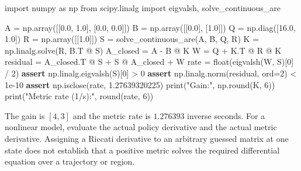 \documentclass[
  10pt,
  letterpaper,
  DIV=11,
  numbers=noendperiod]{scrartcl}
\newenvironment{Shaded}{\begin{snugshade}}{\end{snugshade}}
\newcommand{\BuiltInTok}[1]{\textcolor[rgb]{0.00,0.23,0.31}{#1}}
\newcommand{\ControlFlowTok}[1]{\textcolor[rgb]{0.00,0.23,0.31}{\textbf{#1}}}
\newcommand{\DecValTok}[1]{\textcolor[rgb]{0.68,0.00,0.00}{#1}}
\newcommand{\FloatTok}[1]{\textcolor[rgb]{0.68,0.00,0.00}{#1}}
\newcommand{\ImportTok}[1]{\textcolor[rgb]{0.00,0.46,0.62}{#1}}
\newcommand{\NormalTok}[1]{\textcolor[rgb]{0.00,0.23,0.31}{#1}}
\newcommand{\OperatorTok}[1]{\textcolor[rgb]{0.37,0.37,0.37}{#1}}
\newcommand{\StringTok}[1]{\textcolor[rgb]{0.13,0.47,0.30}{#1}}
\begin{document}
\begin{Shaded}
\begin{Highlighting}[]
\ImportTok{import}\NormalTok{ numpy }\ImportTok{as}\NormalTok{ np}
\ImportTok{from}\NormalTok{ scipy.linalg }\ImportTok{import}\NormalTok{ eigvalsh, solve\_continuous\_are}

\NormalTok{A }\OperatorTok{=}\NormalTok{ np.array([[}\FloatTok{0.0}\NormalTok{, }\FloatTok{1.0}\NormalTok{], [}\FloatTok{0.0}\NormalTok{, }\FloatTok{0.0}\NormalTok{]])}
\NormalTok{B }\OperatorTok{=}\NormalTok{ np.array([[}\FloatTok{0.0}\NormalTok{], [}\FloatTok{1.0}\NormalTok{]])}
\NormalTok{Q }\OperatorTok{=}\NormalTok{ np.diag([}\FloatTok{16.0}\NormalTok{, }\FloatTok{1.0}\NormalTok{])}
\NormalTok{R }\OperatorTok{=}\NormalTok{ np.array([[}\FloatTok{1.0}\NormalTok{]])}
\NormalTok{S }\OperatorTok{=}\NormalTok{ solve\_continuous\_are(A, B, Q, R)}
\NormalTok{K }\OperatorTok{=}\NormalTok{ np.linalg.solve(R, B.T }\OperatorTok{@}\NormalTok{ S)}
\NormalTok{A\_closed }\OperatorTok{=}\NormalTok{ A }\OperatorTok{{-}}\NormalTok{ B }\OperatorTok{@}\NormalTok{ K}
\NormalTok{W }\OperatorTok{=}\NormalTok{ Q }\OperatorTok{+}\NormalTok{ K.T }\OperatorTok{@}\NormalTok{ R }\OperatorTok{@}\NormalTok{ K}
\NormalTok{residual }\OperatorTok{=}\NormalTok{ A\_closed.T }\OperatorTok{@}\NormalTok{ S }\OperatorTok{+}\NormalTok{ S }\OperatorTok{@}\NormalTok{ A\_closed }\OperatorTok{+}\NormalTok{ W}
\NormalTok{rate }\OperatorTok{=} \BuiltInTok{float}\NormalTok{(eigvalsh(W, S)[}\DecValTok{0}\NormalTok{] }\OperatorTok{/} \DecValTok{2}\NormalTok{)}
\ControlFlowTok{assert}\NormalTok{ np.linalg.eigvalsh(S)[}\DecValTok{0}\NormalTok{] }\OperatorTok{\textgreater{}} \DecValTok{0}
\ControlFlowTok{assert}\NormalTok{ np.linalg.norm(residual, }\BuiltInTok{ord}\OperatorTok{=}\DecValTok{2}\NormalTok{) }\OperatorTok{\textless{}} \FloatTok{1e{-}10}
\ControlFlowTok{assert}\NormalTok{ np.isclose(rate, }\FloatTok{1.27639320225}\NormalTok{)}
\BuiltInTok{print}\NormalTok{(}\StringTok{"Gain:"}\NormalTok{, np.}\BuiltInTok{round}\NormalTok{(K, }\DecValTok{6}\NormalTok{))}
\BuiltInTok{print}\NormalTok{(}\StringTok{"Metric rate (1/s):"}\NormalTok{, }\BuiltInTok{round}\NormalTok{(rate, }\DecValTok{6}\NormalTok{))}
\end{Highlighting}
\end{Shaded}

The gain is \([4,3]\) and the metric rate is \(1.276393\) inverse
seconds. For a nonlinear model, evaluate the actual policy derivative
and the actual metric derivative. Assigning a Riccati derivative to an
arbitrary guessed matrix at one state does not establish that a positive
metric solves the required differential equation over a trajectory or
region.
\end{document}
